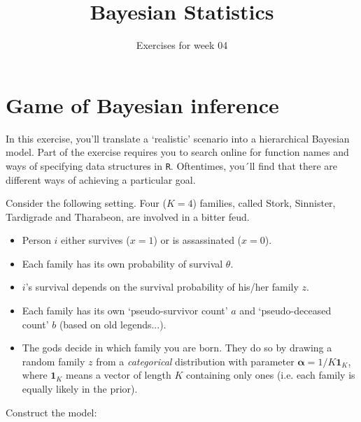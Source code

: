 \documentclass[a4paper]{article}
\title{Bayesian Statistics}
\author{Exercises for week 04}
\date{\vspace{-5ex}}
\renewcommand{\v}[1]{\mathbf{\bm #1}}
\begin{document}
\maketitle


\section{Game of Bayesian inference}

In this exercise, you'll translate a `realistic' scenario into a hierarchical Bayesian model. Part of the exercise requires you to search online for function names and ways of specifying data structures in \texttt{R}. Oftentimes, you´ll find that there are different ways of achieving a particular goal.

Consider the following setting. Four ($K=4$) families, called Stork, Sinnister, Tardigrade and Tharabeon, are involved in a bitter feud.
\begin{itemize}
    \item Person $i$ either survives ($x=1$) or is assassinated ($x=0$).
    \item Each family has its own probability of survival $\theta$.
    \item $i$'s survival depends on the survival probability of his/her family $z$.
    \item Each family has its own `pseudo-survivor count' $a$ and `pseudo-deceased count' $b$ (based on old legends...).
    \item The gods decide in which family you are born. They do so by drawing a random family $z$ from a \emph{categorical} distribution with parameter $\v{\alpha}=1/K \v{1}_K$, where $\v{1}_K$ means a vector of length $K$ containing only ones (i.e. each family is equally likely in the prior).
\end{itemize}

Construct the model:
\end{document}
